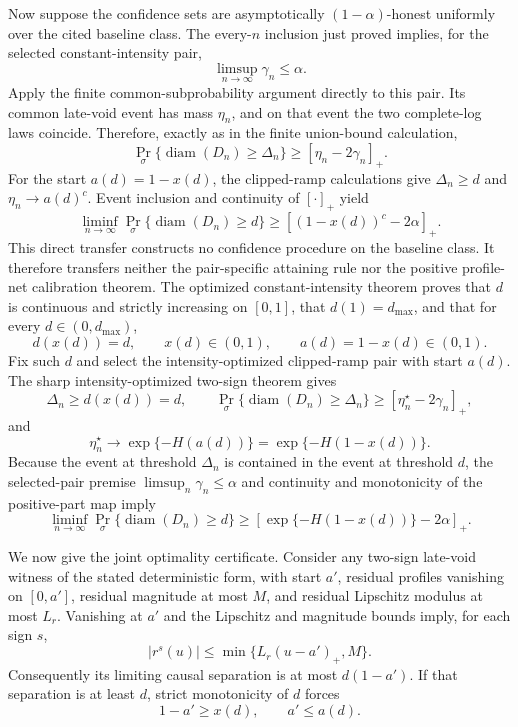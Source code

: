 Now suppose the confidence sets are asymptotically \((1-\alpha)\)-honest uniformly over the cited baseline class.  The every-\(n\) inclusion just proved implies, for the selected constant-intensity pair,
\[
 \limsup_{n\to\infty}\gamma_n\le\alpha.
\]
Apply the finite common-subprobability argument directly to this pair.  Its common late-void event has mass \(\eta_n\), and on that event the two complete-log laws coincide.  Therefore, exactly as in the finite union-bound calculation,
\[
 \Pr_\sigma\{\operatorname{diam}(D_n)\ge\Delta_n\}
 \ge[\eta_n-2\gamma_n]_+.
\]
For the start \(a(d)=1-x(d)\), the clipped-ramp calculations give \(\Delta_n\ge d\) and \(\eta_n\to a(d)^c\).  Event inclusion and continuity of \([\cdot]_+\) yield
\[
 \liminf_{n\to\infty}
 \Pr_\sigma\{\operatorname{diam}(D_n)\ge d\}
 \ge[(1-x(d))^c-2\alpha]_+.
\]
This direct transfer constructs no confidence procedure on the baseline class.  It therefore transfers neither the pair-specific attaining rule nor the positive profile-net calibration theorem.
The optimized constant-intensity theorem proves that \(d\) is continuous and strictly increasing on \([0,1]\), that \(d(1)=d_{\max}\), and that for every \(d\in(0,d_{\max})\),
\[
 d(x(d))=d,
 \qquad x(d)\in(0,1),
 \qquad a(d)=1-x(d)\in(0,1).
\]
Fix such \(d\) and select the intensity-optimized clipped-ramp pair with start \(a(d)\).  The sharp intensity-optimized two-sign theorem gives
\[
 \Delta_n\ge d(x(d))=d,
 \qquad
 \Pr_\sigma\{\operatorname{diam}(D_n)\ge\Delta_n\}
 \ge[\eta_n^\star-2\gamma_n]_+,
\]
and
\[
 \eta_n^\star\longrightarrow
 \exp\{-H(a(d))\}
 =\exp\{-H(1-x(d))\}.
\]
Because the event at threshold \(\Delta_n\) is contained in the event at threshold \(d\), the selected-pair premise \(\limsup_n\gamma_n\le\alpha\) and continuity and monotonicity of the positive-part map imply
\[
 \liminf_{n\to\infty}
 \Pr_\sigma\{\operatorname{diam}(D_n)\ge d\}
 \ge
 \left[\exp\{-H(1-x(d))\}-2\alpha\right]_+.
\]

We now give the joint optimality certificate.  Consider any two-sign late-void witness of the stated deterministic form, with start \(a'\), residual profiles vanishing on \([0,a']\), residual magnitude at most \(M\), and residual Lipschitz modulus at most \(L_r\).  Vanishing at \(a'\) and the Lipschitz and magnitude bounds imply, for each sign \(s\),
\[
 |r^s(u)|\le\min\{L_r(u-a')_+,M\}.
\]
Consequently its limiting causal separation is at most \(d(1-a')\).  If that separation is at least \(d\), strict monotonicity of \(d\) forces
\[
 1-a'\ge x(d),
 \qquad a'\le a(d).
\]

